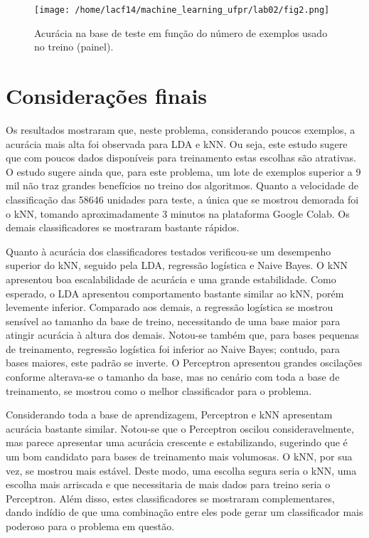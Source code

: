 \documentclass[
	12pt,				%
	openright,			%
	twoside,			%
	a4paper,			%
	english,			%
	brazil,				%
	svgnames
	]{abntex2}\usepackage[]{graphicx}\usepackage[]{color}
\begin{document}
\begin{landscape}

\begin{figure}[]
\label{fig:fig2}
\centering
\texttt{[image: /home/lacf14/machine\_learning\_ufpr/lab02/fig2.png]}
\caption{Acurácia na base de teste em função do número de exemplos usado no treino (painel).}
\end{figure}
\end{landscape}

\chapter{Considerações finais}
\label{cap:conclusao}


Os resultados mostraram que, neste problema, considerando poucos exemplos, a acurácia mais alta foi observada para LDA e kNN. Ou seja, este estudo sugere que com poucos dados disponíveis para treinamento estas escolhas são atrativas. O estudo sugere ainda que, para este problema, um lote de exemplos superior a 9 mil não traz grandes benefícios no treino dos algoritmos. Quanto a velocidade de classificação das 58646 unidades para teste, a única que se mostrou demorada foi o kNN, tomando aproximadamente 3 minutos na plataforma Google Colab. Os demais classificadores se mostraram bastante rápidos.

Quanto à acurácia dos classificadores testados verificou-se um desempenho superior do kNN, seguido pela LDA, regressão logística e Naive Bayes. O kNN apresentou boa escalabilidade de acurácia e uma grande estabilidade. Como esperado, o LDA apresentou comportamento bastante similar ao kNN, porém levemente inferior. Comparado aos demais, a regressão logística se mostrou sensível ao tamanho da base de treino, necessitando de uma base maior para atingir acurácia à altura dos demais. Notou-se também que, para bases pequenas de treinamento, regressão logística foi inferior ao Naive Bayes; contudo, para bases maiores, este padrão se inverte. O Perceptron apresentou grandes oscilações conforme alterava-se o tamanho da base, mas no cenário com toda a base de treinamento, se mostrou como o melhor classificador para o problema.

Considerando toda a base de aprendizagem, Perceptron e kNN apresentam acurácia bastante similar. Notou-se que o Perceptron oscilou consideravelmente, mas parece apresentar uma acurácia crescente e estabilizando, sugerindo que é um bom candidato para bases de treinamento mais volumosas. O kNN, por sua vez, se mostrou mais estável. Deste modo, uma escolha segura seria o kNN, uma escolha mais arriscada e que necessitaria de mais dados para treino seria o Perceptron. Além disso, estes classificadores se mostraram complementares, dando indídio de que uma combinação entre eles pode gerar um classificador mais poderoso para o problema em questão.
\end{document}
